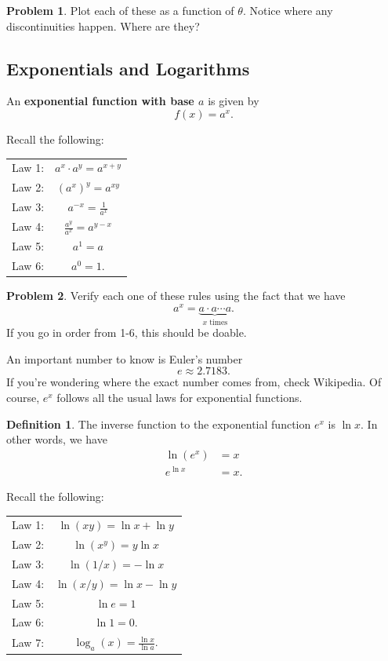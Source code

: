 \documentclass[12pt]{article}
\theoremstyle{definition}
\newtheorem{definition}{Definition}[section]
\newtheorem{problem}{Problem}[section]
\begin{document}
\begin{problem}
Plot each of these as a function of $\theta$.  Notice where any discontinuities happen.  Where are they?
\end{problem}

\subsection{Exponentials and Logarithms}

An \textbf{exponential function with base $a$} is given by
\[
f(x)=a^x.
\]

Recall the following:

\begin{center}
\begin{tabular}{cc}
    Law 1: & $a^x\cdot a^y = a^{x+y}$\\
    Law 2: & $(a^x)^y=a^{xy}$\\
    Law 3: & $a^{-x}=\frac{1}{a^x}$\\
    Law 4: & $\frac{a^y}{a^x}=a^{y-x}$\\
    Law 5: & $a^1=a$\\
    Law 6: & $a^0=1$.
\end{tabular}
\end{center}

\begin{problem}
Verify each one of these rules using the fact that we have
\[
a^x = \underbrace{a\cdot a \cdots a}_{\textrm{$x$ times}}. 
\]
If you go in order from 1-6, this should be doable.
\end{problem}

An important number to know is Euler's number
\[
e\approx 2.7183.
\]
If you're wondering where the exact number comes from, check Wikipedia. Of course, $e^x$ follows all the usual laws for exponential functions.

\begin{definition}
The inverse function to the exponential function $e^x$ is $\ln x$.  In other words, we have
\begin{align*}
    \ln(e^x)&=x\\
    e^{\ln x}&=x.
\end{align*}
\end{definition}

Recall the following:

\begin{center}
\begin{tabular}{cc}
    Law 1: & $\ln (xy) = \ln x + \ln y$\\
    Law 2: & $\ln(x^y)=y\ln x$\\
    Law 3: & $\ln(1/x)=-\ln x$\\
    Law 4: & $\ln(x/y)=\ln x - \ln y$\\
    Law 5: & $\ln e =1$\\
    Law 6: & $\ln 1 = 0$.\\
    Law 7: & $\log_a (x) = \frac{\ln x}{\ln a}.$
\end{tabular}
\end{center}
\end{document}
